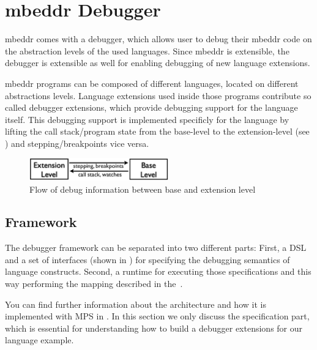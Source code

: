 \section{mbeddr Debugger}
\label{mbeddrDebugger}

mbeddr comes with a debugger, which allows user to debug their mbeddr code 
on the abstraction levels of the used languages. Since mbeddr
is extensible, the debugger is extensible
as well for enabling debugging of new language extensions.

mbeddr programs can be composed of different languages, located on different
abstractions levels. Language extensions used inside those programs contribute
so called debugger extensions, which provide debugging support for the language
itself. This debugging support is implemented specificly for the language by
lifting the call stack/program state from the base-level to the
extension-level (see ) and stepping/breakpoints
vice versa.

\begin{figure}[h]
  \vspace{-2mm}
  \centering
    \includegraphics[width=6cm]{./figures/two-levels.png} 
    \vspace{-2mm}
    \caption{Flow of debug information between base and
    extension level~\cite{DBLP:conf/adaEurope/AdaEuropeDeb}}
  \label{infoFlow}
  \vspace{-2mm}
\end{figure}


\subsection{Framework}
\label{mbeddrDebuggerFramework}

The debugger framework can be separated into two different parts: First, a
\ac{DSL} and a set of interfaces (shown in ) for specifying the
debugging semantics of language constructs. 
Second, a runtime for executing those specifications and
this way performing the mapping described in the~. 

You can find further information about the architecture and how it is
implemented with \ac{MPS} in \cite{DBLP:conf/adaEurope/AdaEuropeDeb}. In this
section we only discuss the specification part, which is essential for
understanding how to build a debugger extensions for our language example.

